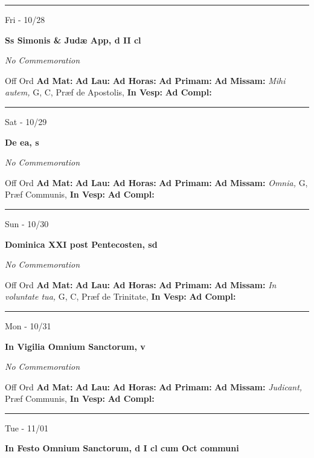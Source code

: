 \documentclass[letterpaper, 10pt]{article}
\begin{document}
\hrule
\begin{center}
Fri - 10/28
\end{center}\textbf{ \large Ss Simonis \& Judæ App, \textnormal{\normalsize d II cl}}

\textit{No Commemoration}\begin{justify}
Off Ord
\textbf{Ad Mat: }
\textbf{Ad Lau: }
\textbf{Ad Horas: }
\textbf{Ad Primam: }
\textbf{Ad Missam:} \textit{Mihi autem, } G, C, Præf de Apostolis, 
\textbf{In Vesp: }
\textbf{Ad Compl: }\end{justify}



\hrule
\begin{center}
Sat - 10/29
\end{center}\textbf{ \large De ea, \textnormal{\normalsize s}}

\textit{No Commemoration}\begin{justify}
Off Ord
\textbf{Ad Mat: }
\textbf{Ad Lau: }
\textbf{Ad Horas: }
\textbf{Ad Primam: }
\textbf{Ad Missam:} \textit{Omnia, } G, Præf Communis, 
\textbf{In Vesp: }
\textbf{Ad Compl: }\end{justify}



\hrule
\begin{center}
Sun - 10/30
\end{center}\textbf{ \large Dominica XXI post Pentecosten, \textnormal{\normalsize sd}}

\textit{No Commemoration}\begin{justify}
Off Ord
\textbf{Ad Mat: }
\textbf{Ad Lau: }
\textbf{Ad Horas: }
\textbf{Ad Primam: }
\textbf{Ad Missam:} \textit{In voluntate tua, } G, C, Præf de Trinitate, 
\textbf{In Vesp: }
\textbf{Ad Compl: }\end{justify}



\hrule
\begin{center}
Mon - 10/31
\end{center}\textbf{ \large In Vigilia Omnium Sanctorum, \textnormal{\normalsize v}}

\textit{No Commemoration}\begin{justify}
Off Ord
\textbf{Ad Mat: }
\textbf{Ad Lau: }
\textbf{Ad Horas: }
\textbf{Ad Primam: }
\textbf{Ad Missam:} \textit{Judicant, } Præf Communis, 
\textbf{In Vesp: }
\textbf{Ad Compl: }\end{justify}



\hrule
\begin{center}
Tue - 11/01
\end{center}\textbf{ \large In Festo Omnium Sanctorum, \textnormal{\normalsize d I cl cum Oct communi}}
\end{document}
